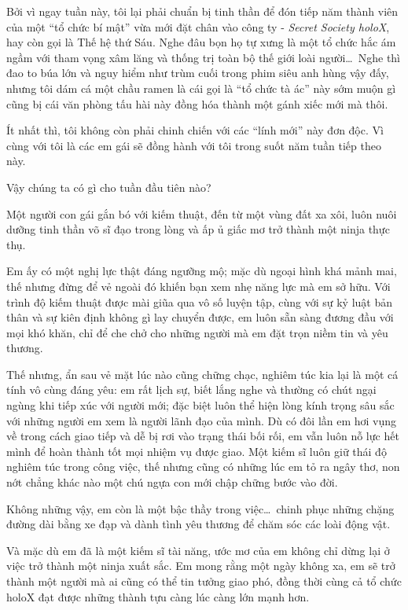\documentclass[../main.tex]{subfiles}
\begin{document}
Bởi vì ngay tuần này, tôi lại phải chuẩn bị tinh thần để đón tiếp năm thành viên của một ``tổ chức bí mật'' vừa mới đặt chân vào công ty - \textit{Secret Society holoX}, hay còn gọi là Thế hệ thứ Sáu. Nghe đâu bọn họ tự xưng là một tổ chức hắc ám ngầm với tham vọng xâm lăng và thống trị toàn bộ thế giới loài người\dots\ Nghe thì đao to búa lớn và nguy hiểm như trùm cuối trong phim siêu anh hùng vậy đấy, nhưng tôi dám cá một chầu ramen là cái gọi là ``tổ chức tà ác'' này sớm muộn gì cũng bị cái văn phòng tấu hài này đồng hóa thành một gánh xiếc mới mà thôi.

Ít nhất thì, tôi không còn phải chinh chiến với các ``lính mới'' này đơn độc. Vì cùng với tôi là các em gái sẽ đồng hành với tôi trong suốt năm tuần tiếp theo này.

Vậy chúng ta có gì cho tuần đầu tiên nào?

Một người con gái gắn bó với kiếm thuật, đến từ một vùng đất xa xôi, luôn nuôi dưỡng tinh thần võ sĩ đạo trong lòng và ấp ủ giấc mơ trở thành một ninja thực thụ.

Em ấy có một nghị lực thật đáng ngưỡng mộ; mặc dù ngoại hình khá mảnh mai, thế nhưng đừng để vẻ ngoài đó khiến bạn xem nhẹ năng lực mà em sở hữu. Với trình độ kiếm thuật được mài giũa qua vô số luyện tập, cùng với sự kỷ luật bản thân và sự kiên định không gì lay chuyển được, em luôn sẵn sàng đương đầu với mọi khó khăn, chỉ để che chở cho những người mà em đặt trọn niềm tin và yêu thương.

Thế nhưng, ẩn sau vẻ mặt lúc nào cũng chững chạc, nghiêm túc kia lại là một cá tính vô cùng đáng yêu: em rất lịch sự, biết lắng nghe và thường có chút ngại ngùng khi tiếp xúc với người mới; đặc biệt luôn thể hiện lòng kính trọng sâu sắc với những người em xem là người lãnh đạo của mình. Dù có đôi lần em hơi vụng về trong cách giao tiếp và dễ bị rơi vào trạng thái bối rối, em vẫn luôn nỗ lực hết mình để hoàn thành tốt mọi nhiệm vụ được giao. Một kiếm sĩ luôn giữ thái độ nghiêm túc trong công việc, thế nhưng cũng có những lúc em tỏ ra ngây thơ, non nớt chẳng khác nào một chú ngựa con mới chập chững bước vào đời.

Không những vậy, em còn là một bậc thầy trong việc\dots\ chinh phục những chặng đường dài bằng xe đạp và dành tình yêu thương để chăm sóc các loài động vật.

Và mặc dù em đã là một kiếm sĩ tài năng, ước mơ của em không chỉ dừng lại ở việc trở thành một ninja xuất sắc. Em mong rằng một ngày không xa, em sẽ trở thành một người mà ai cũng có thể tin tưởng giao phó, đồng thời cùng cả tổ chức holoX đạt được những thành tựu càng lúc càng lớn mạnh hơn.
\end{document}
